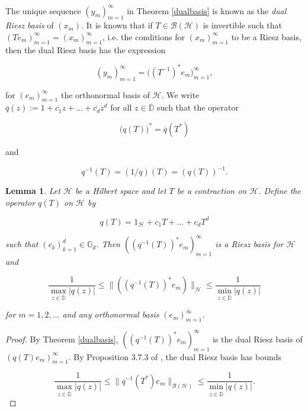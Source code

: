 \documentclass[10pt, reqno]{amsart}
\newtheorem{lemma}[theorem]{Lemma}
\theoremstyle{definition}
\numberwithin{equation}{section}
\begin{document}
The unique sequence $(y_{m})_{m=1}^{\infty}$ in Theorem \ref{dualbasis} is known as the {\it{dual Riesz basis}} of $(x_{m})$. It is known that if $T\in\mathcal{B(H)}$ is invertible such that $(Te_{m})_{m=1}^{\infty}=(x_{m})_{m=1}^{\infty}$, i.e. the conditions for $(x_{m})_{m=1}^{\infty}$ to be a Riesz basis, then the dual Riesz basis has the expression 

$$(y_{m})_{m=1}^{\infty} = \big((T^{-1})^{*}e_{m}\big)_{m=1}^{\infty},$$

\noindent for $(e_{m})_{m=1}^{\infty}$ the orthonormal basis of $\mathcal{H}$. We write $\overline{q}(z) := 1+\overline{c_{1}}z+\hdots+\overline{c_{d}}z^{d}$ for all $z\in\overline{\mathbb{D}}$ such that the operator 

$$\big(q(T)\big)^{*}=\overline{q}(T^{*})$$

\noindent and 

\begin{equation}\label{inverseqoperator}
q^{-1}(T) = (1/q)(T) = (q(T))^{-1}.
\end{equation}

\begin{lemma}\label{dualbasisisbasis}
Let $\mathcal{H}$ be a Hilbert space and let $T$ be a contraction on $\mathcal{H}$. Define the operator $q(T)$ on $\mathcal{H}$ by

$$q(T)=1_{\mathcal{H}}+c_{1}T+\hdots+c_{d}T^{d}$$

\noindent such that $(c_{k})_{k=1}^{d}\in \mathbb{G}_{d}$. Then $((q^{-1}(T))^{*}e_{m})_{m=1}^{\infty}$ is a Riesz basis for $\mathcal{H}$ and

\begin{equation}\label{inequalityforQdinverseadjoint}
    \dfrac{1}{\max_{z\in\overline{\mathbb{D}}}|q(z)|} \leq \|((q^{-1}(T))^{*}e_{m})\|_{\mathcal{H}}\leq \dfrac{1}{\min_{z\in\overline{\mathbb{D}}}|q(z)|}
\end{equation}

\noindent for $m=1,2,\hdots$ and any orthonormal basis $(e_{m})_{m=1}^{\infty}$.

\end{lemma}

\begin{proof}
    By Theorem \ref{dualbasis}, $((q^{-1}(T))^{*}e_{m})_{m=1}^{\infty}$ is the dual Riesz basis of $(q(T)e_{m})_{m=1}^{\infty}$. By Proposition 3.7.3 of \cite{Christensen}, the dual Riesz basis has bounds

$$\dfrac{1}{\max_{z\in\overline{\mathbb{D}}}|q(z)|}\leq \|\overline{q}^{-1}(T^{*})e_{m}\|_{\mathcal{B}(\mathcal{H})}\leq \dfrac{1}{\min_{z\in\overline{\mathbb{D}}}|q(z)|}.$$\end{proof}
\end{document}
